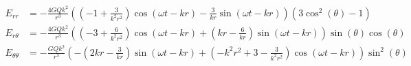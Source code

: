 \documentclass{article}
\begin{document}

\addtocounter{equation}{6}
\begin{align}
    E_{rr} &= - \frac{4 G Q k^{2}}{r^{3}} \left(\left(-1 + \frac{3}{k^{2} r^{2}}\right) \cos{\left (\omega t - k r \right )} - \frac{3}{k r} \sin{\left (\omega t - k r \right )}\right) \left(3 \cos^{2}{\left (\theta \right )} - 1\right) \\
    E_{r\theta} &= - \frac{4 G Q k^{2}}{r^{3}} \left(\left(-3 + \frac{6}{k^{2} r^{2}}\right) \cos{\left (\omega t - k r \right )} + \left(k r - \frac{6}{k r}\right) \sin{\left (\omega t - k r \right )}\right) \sin{\left (\theta \right )} \cos{\left (\theta \right )} \\
    E_{\theta\theta} &= - \frac{G Q k^{2}}{r^{3}} \left(- \left(2 k r - \frac{3}{k r}\right) \sin{\left (\omega t - k r \right )} + \left(- k^{2} r^{2} + 3 - \frac{3}{k^{2} r^{2}}\right) \cos{\left (\omega t - k r \right )}\right) \sin^{2}{\left (\theta \right )}
\end{align}
\end{document}
